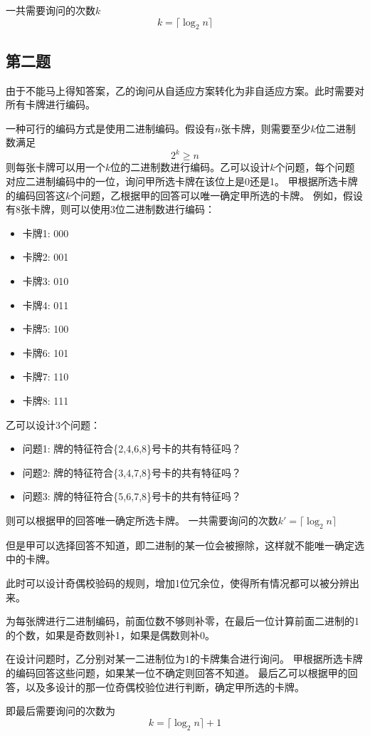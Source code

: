 \documentclass{ctexart}
\begin{document}
一共需要询问的次数$k$
\[
k = \lceil \log_2{n} \rceil
\]
\subsection{第二题}
由于不能马上得知答案，乙的询问从自适应方案转化为非自适应方案。此时需要对所有卡牌进行编码。

一种可行的编码方式是使用二进制编码。假设有$n$张卡牌，则需要至少$k$位二进制数满足
\[2^k \ge n\]
则每张卡牌可以用一个$k$位的二进制数进行编码。乙可以设计$k$个问题，每个问题对应二进制编码中的一位，询问甲所选卡牌在该位上是0还是1。
甲根据所选卡牌的编码回答这$k$个问题，乙根据甲的回答可以唯一确定甲所选的卡牌。
例如，假设有8张卡牌，则可以使用3位二进制数进行编码：
\begin{itemize}
    \item 卡牌1: 000
    \item 卡牌2: 001
    \item 卡牌3: 010
    \item 卡牌4: 011
    \item 卡牌5: 100
    \item 卡牌6: 101
    \item 卡牌7: 110
    \item 卡牌8: 111
\end{itemize}
乙可以设计3个问题：
\begin{itemize}
    \item 问题1: 牌的特征符合\{2,4,6,8\}号卡的共有特征吗？
    \item 问题2: 牌的特征符合\{3,4,7,8\}号卡的共有特征吗？
    \item 问题3: 牌的特征符合\{5,6,7,8\}号卡的共有特征吗？
\end{itemize}
则可以根据甲的回答唯一确定所选卡牌。
一共需要询问的次数$k' = \lceil \log_2{n} \rceil$

但是甲可以选择回答不知道，即二进制的某一位会被擦除，这样就不能唯一确定选中的卡牌。

此时可以设计奇偶校验码的规则，增加1位冗余位，使得所有情况都可以被分辨出来。

为每张牌进行二进制编码，前面位数不够则补零，在最后一位计算前面二进制的1的个数，如果是奇数则补1，如果是偶数则补0。

在设计问题时，乙分别对某一二进制位为1的卡牌集合进行询问。
甲根据所选卡牌的编码回答这些问题，如果某一位不确定则回答不知道。
最后乙可以根据甲的回答，以及多设计的那一位奇偶校验位进行判断，确定甲所选的卡牌。

即最后需要询问的次数为
\[k = \lceil \log_2{n} \rceil + 1\]
\end{document}
